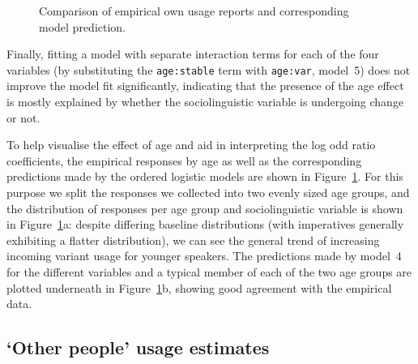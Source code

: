 \begin{figure}[htbp]

{\centering {}

}

\caption[Comparison of empirical own usage reports and corresponding model prediction]{Comparison of empirical own usage reports and corresponding model prediction.}\label{fig:selfresponsesprediction}
\end{figure}



Finally, fitting a model with separate interaction terms for each of the four variables (by substituting the \texttt{age:stable} term with \texttt{age:var}, model~5) does not improve the model fit significantly, indicating that the presence of the age effect is mostly explained by whether the sociolinguistic variable is undergoing change or not.

To help visualise the effect of age and aid in interpreting the log odd ratio coefficients, the empirical responses by age as well as the corresponding predictions made by the ordered logistic models are shown in Figure~\ref{fig:selfresponsesprediction}. For this purpose we split the responses we collected into two evenly sized age groups, %
and the distribution of responses per age group and sociolinguistic variable is shown in Figure~\ref{fig:selfresponsesprediction}a: despite differing baseline distributions (with imperatives generally exhibiting a flatter distribution), we can see the general trend of increasing incoming variant usage for younger speakers. The predictions made by model~4 for the different variables and a typical member of each of the two age groups are plotted underneath in Figure~\ref{fig:selfresponsesprediction}b, showing good agreement with the empirical data.

\subsection{`Other people' usage estimates}
\label{sec:otherresponses}


